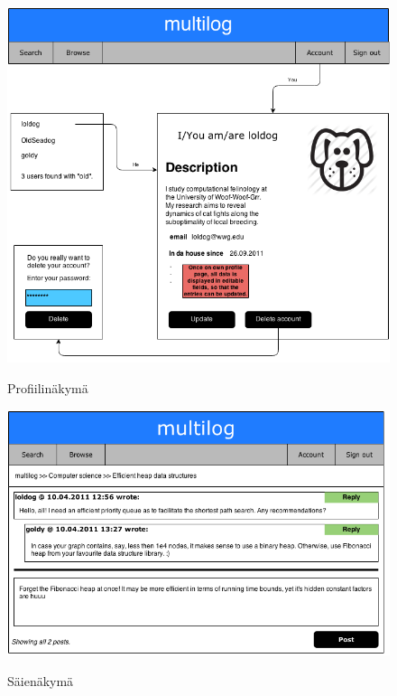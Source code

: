 \documentclass[10pt]{article}
\begin{document}
\begin{figure}
  \caption{Profiilinäkymä}
  \centering
  \includegraphics[width=\textwidth, keepaspectratio]{UIAccountView}
  \label{fig:profileview}
\end{figure}

\begin{figure}
  \caption{Säienäkymä}
  \centering
  \includegraphics[width=\textwidth, keepaspectratio]{UIThreadView}
  \label{fig:threadview}
\end{figure}
\newpage
\end{document}
